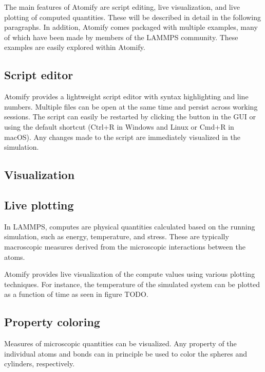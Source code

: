 \documentclass[aps,pre,twocolumn,letterpaper,floatfix]{revtex4}
\begin{document}
{The main features of Atomify are script editing,
live visualization, and live plotting of computed quantities.
These will be described in detail in the following paragraphs.
In addition, Atomify comes packaged with multiple examples,
many of which have been made by members of the LAMMPS community.
These examples are easily explored within Atomify.


\subsection{Script editor}

Atomify provides a lightweight script editor with syntax highlighting and line
numbers.
Multiple files can be open at the same time and persist across working sessions.
The script can easily be restarted by clicking the button in the GUI or using
the default shortcut (Ctrl+R in Windows and Linux or Cmd+R in macOS).
Any changes made to the script are immediately visualized in the simulation.

\subsection{Visualization}

\subsection{Live plotting}

In LAMMPS, computes are physical quantities calculated based on the running
simulation, such as energy, temperature, and stress.
These are typically macroscopic measures derived from the microscopic
interactions between the atoms.

Atomify provides live visualization of the compute values using various plotting
techniques.
For instance, the temperature of the simulated system can be plotted as a
function of time as seen in figure TODO.

\subsection{Property coloring}

Measures of microscopic quantities can be visualized.
Any property of the individual atoms and bonds can in principle be used to color
the spheres and cylinders, respectively.

}
\end{document}
